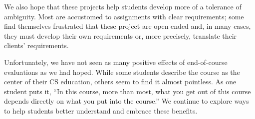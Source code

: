 We also hope that these projects help students develop more of a
tolerance of ambiguity.  Most are accustomed to assignments with
clear requirements; some find themselves frustrated that these 
project are open ended and, in many cases, they must develop
their own requirements or, more precisely, translate their clients'
requirements.

Unfortunately, we have not seen as many positive effects of
end-of-course evaluations as we had hoped.  While some students
describe the course as the center of their CS education, others
seem to find it almost pointless.  As one student puts it, ``In this course,
more than most, what you get out of this course depends directly
on what you put into the course.''  We continue to explore ways to
help students better understand and embrace these benefits.

